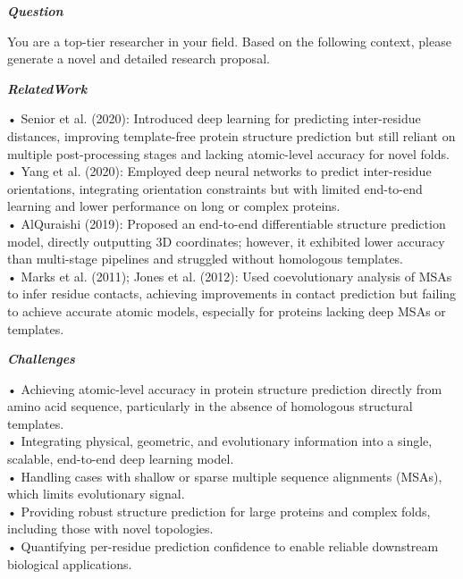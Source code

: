 \begin{tcolorbox}[
    breakable,
    title={Example of Idea Generation in Life},
    colback=LighterGray,
    colframe=DeepPurple,
    colbacktitle=DeepPurple,
    coltitle=White,
]
\textbf{\emph{\textcolor{DeepPurple}{Question}}}

You are a top-tier researcher in your field. Based on the following context, please generate a novel and detailed research proposal.

\textbf{\emph{\textcolor{CaseOrange}{RelatedWork}}}

• Senior et al. (2020): Introduced deep learning for predicting inter-residue distances, improving template-free protein structure prediction but still reliant on multiple post-processing stages and lacking atomic-level accuracy for novel folds. \\
• Yang et al. (2020): Employed deep neural networks to predict inter-residue orientations, integrating orientation constraints but with limited end-to-end learning and lower performance on long or complex proteins. \\
• AlQuraishi (2019): Proposed an end-to-end differentiable structure prediction model, directly outputting 3D coordinates; however, it exhibited lower accuracy than multi-stage pipelines and struggled without homologous templates. \\
• Marks et al. (2011); Jones et al. (2012): Used coevolutionary analysis of MSAs to infer residue contacts, achieving improvements in contact prediction but failing to achieve accurate atomic models, especially for proteins lacking deep MSAs or templates. 

\textbf{\emph{\textcolor{CaseOrange}{Challenges}}}

• Achieving atomic-level accuracy in protein structure prediction directly from amino acid sequence, particularly in the absence of homologous structural templates. \\
• Integrating physical, geometric, and evolutionary information into a single, scalable, end-to-end deep learning model. \\
• Handling cases with shallow or sparse multiple sequence alignments (MSAs), which limits evolutionary signal. \\
• Providing robust structure prediction for large proteins and complex folds, including those with novel topologies. \\
• Quantifying per-residue prediction confidence to enable reliable downstream biological applications. 


\end{tcolorbox}
